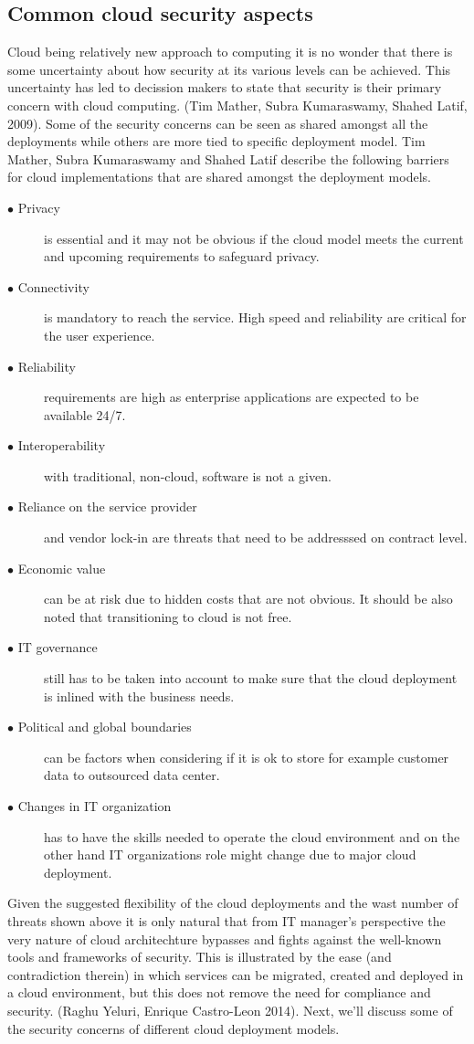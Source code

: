 \documentclass{article}
\begin{document}
\subsection{Common cloud security aspects}
Cloud being relatively new approach to computing it is no wonder that there is some uncertainty about how security at its various levels can be achieved. This uncertainty has led to decission makers to state that security is their primary concern with cloud computing. (Tim Mather, Subra Kumaraswamy, Shahed Latif, 2009). 
Some of the security concerns can be seen as shared amongst all the deployments while others are more tied to specific deployment model.
Tim Mather, Subra Kumaraswamy and Shahed Latif describe the following barriers for cloud implementations that are shared amongst the deployment models.
\begin{description}
        \item[$\bullet$ Privacy] is essential and it may not be obvious if the cloud model meets the current and upcoming requirements to safeguard privacy.
        \item[$\bullet$ Connectivity] is mandatory to reach the service. High speed and reliability are critical for the user experience.
        \item[$\bullet$ Reliability] requirements are high as enterprise applications are expected to be available 24/7.
        \item[$\bullet$ Interoperability] with traditional, non-cloud, software is not a given.
        \item[$\bullet$ Reliance on the service provider] and vendor lock-in are threats that need to be addresssed on contract level.
        \item[$\bullet$ Economic value] can be at risk due to hidden costs that are not obvious. It should be also noted that transitioning to cloud is not free.
        \item[$\bullet$ IT governance] still has to be taken into account to make sure that the cloud deployment is inlined with the business needs.
        \item[$\bullet$ Political and global boundaries] can be factors when considering if it is ok to store for example customer data to outsourced data center.
        \item[$\bullet$ Changes in IT organization] has to have the skills needed to operate the cloud environment and on the other hand IT organizations role might change due to major cloud deployment.
\end{description}
Given the suggested flexibility of the cloud deployments and the wast number of threats shown above it is only natural that from IT manager's perspective the very nature of cloud architechture bypasses and fights against the well-known tools and frameworks of security.
This is illustrated by the ease (and contradiction therein) in which services can be migrated, created and deployed in a cloud environment, but this does not remove the need for compliance and security. (Raghu Yeluri, Enrique Castro-Leon 2014). 
Next, we'll discuss some of the security concerns of different cloud deployment models.
\end{document}
